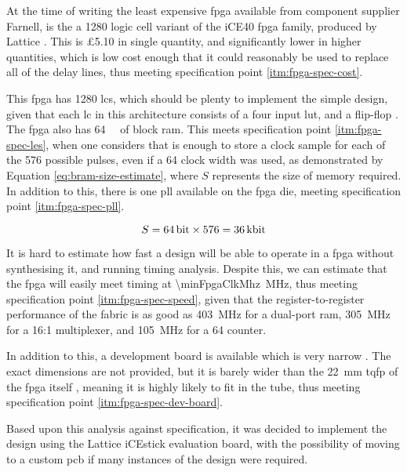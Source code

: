 At the time of writing the least expensive \gls{fpga} available from component supplier Farnell, is the a 1280 logic cell variant of the iCE40 \gls{fpga} family, produced by Lattice \cite{farnell2017}. This is \pounds5.10 in single quantity, and significantly lower in higher quantities, which is low cost enough that it could reasonably be used to replace all of the delay lines, thus meeting specification point \ref{itm:fpga-spec-cost}.

This \gls{fpga} has 1280 \glspl{lc}, which should be plenty to implement the simple design, given that each \gls{lc} in this architecture consists of a four input \gls{lut}, and a flip-flop \cite[p.2-2]{lattice2017a}. The \gls{fpga} also has \SI{64}{\kilo\bit} of block \gls{ram}. This meets specification point \ref{itm:fpga-spec-les}, when one considers that is enough to store a clock sample for each of the 576 possible pulses, even if a \SI{64}{\bit} clock width was used, as demonstrated by Equation \ref{eq:bram-size-estimate}, where $S$ represents the size of memory required. In addition to this, there is one \gls{pll} available on the \gls{fpga} die, meeting specification point \ref{itm:fpga-spec-pll}.

\begin{equation}
	S = \SI{64}{\bit} \times 576 = \SI{36}{\kilo\bit} \label{eq:bram-size-estimate}
\end{equation}

It is hard to estimate how fast a design will be able to operate in a \gls{fpga} without synthesising it, and running timing analysis. Despite this, we can estimate that the \gls{fpga} will easily meet timing at \SI{\minFpgaClkMhz}{\mega\hertz}, thus meeting specification point \ref{itm:fpga-spec-speed}, given that the register-to-register performance of the fabric is as good as \SI{403}{\mega\hertz} for a dual-port \gls{ram}, \SI{305}{\mega\hertz} for a 16:1 multiplexer, and \SI{105}{\mega\hertz} for a \SI{64}{\bit} counter.

In addition to this, a development board is available which is very narrow \cite{lattice2017b}. The exact dimensions are not provided, but it is barely wider than the \SI{22}{\milli\metre} \gls{tqfp} of the \gls{fpga} itself \cite[p.2]{lattice2017b}, meaning it is highly likely to fit in the tube, thus meeting specification point \ref{itm:fpga-spec-dev-board}.

Based upon this analysis against specification, it was decided to implement the design using the Lattice iCEstick evaluation board, with the possibility of moving to a custom \gls{pcb} if many instances of the design were required.

